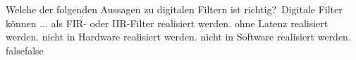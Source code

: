     {Welche der folgenden Aussagen zu digitalen Filtern ist richtig? Digitale Filter können ...}
    {als FIR- oder IIR-Filter realisiert werden.}
    {ohne Latenz realisiert werden.}
    {nicht in Hardware realisiert werden.}
    {nicht in Software realisiert werden.}
    {false}{false}